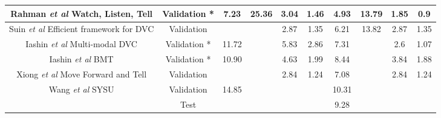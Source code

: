 \begin{table}[]
\begin{tabular}{|c|c|cccc|cccc|}
		Rahman \textit{et al} \cite{rahman2019watch} Watch, Listen, Tell               & Validation *                  & \multicolumn{1}{c|}{7.23}       & \multicolumn{1}{c|}{25.36}      & \multicolumn{1}{c|}{3.04}         & 1.46                  & \multicolumn{1}{c|}{4.93}       & \multicolumn{1}{c|}{13.79}      & \multicolumn{1}{c|}{1.85}         & 0.9          \\ \hline
		Suin \textit{et al} \cite{suin2020efficient} Efficient framework for DVC         & Validation                    & \multicolumn{1}{c|}{}           & \multicolumn{1}{c|}{}           & \multicolumn{1}{c|}{2.87}         & 1.35                  & \multicolumn{1}{c|}{6.21}       & \multicolumn{1}{c|}{13.82}      & \multicolumn{1}{c|}{2.87}         & 1.35         \\ \hline
		Iashin \textit{et al} \cite{iashin2020multimodal} Multi-modal DVC                   & Validation *                  & \multicolumn{1}{c|}{11.72}      & \multicolumn{1}{c|}{}           & \multicolumn{1}{c|}{5.83}         & 2.86                  & \multicolumn{1}{c|}{7.31}       & \multicolumn{1}{l|}{}           & \multicolumn{1}{c|}{2.6}          & 1.07         \\ \hline
		Iashin \textit{et al} \cite{iashin2020better} BMT                               & Validation *                  & \multicolumn{1}{c|}{10.90}      & \multicolumn{1}{c|}{}           & \multicolumn{1}{c|}{4.63}         & 1.99                  & \multicolumn{1}{c|}{8.44}       & \multicolumn{1}{l|}{}           & \multicolumn{1}{c|}{3.84}         & 1.88         \\ \hline
		Xiong \textit{et al} \cite{xiong2018forward} Move Forward and Tell              & Validation                    & \multicolumn{1}{c|}{}           & \multicolumn{1}{c|}{}           & \multicolumn{1}{c|}{2.84}         & 1.24                  & \multicolumn{1}{c|}{7.08}       & \multicolumn{1}{l|}{}           & \multicolumn{1}{c|}{2.84}         & 1.24         \\ \hline
		\multirow{2}{*}{Wang \textit{et al} \cite{wang2020densecaptioning} SYSU}               & Validation                    & \multicolumn{1}{c|}{14.85}      & \multicolumn{1}{c|}{}           & \multicolumn{1}{l|}{}             & \multicolumn{1}{l|}{} & \multicolumn{1}{c|}{10.31}      & \multicolumn{1}{l|}{}           & \multicolumn{1}{c|}{}             &              \\ \cline{2-10} 
		& Test                          & \multicolumn{1}{c|}{}           & \multicolumn{1}{c|}{}           & \multicolumn{1}{l|}{}             & \multicolumn{1}{l|}{} & \multicolumn{1}{c|}{9.28}       & \multicolumn{1}{l|}{}           & \multicolumn{1}{c|}{}             &              \\ \hline

\end{tabular}
\end{table}
